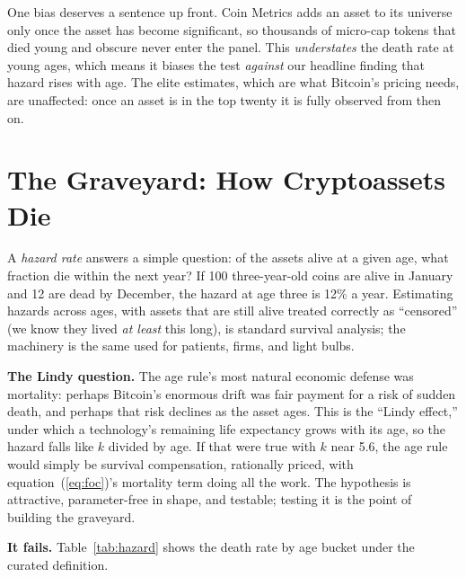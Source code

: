 \documentclass[11pt]{article}
\begin{document}
One bias deserves a sentence up front. Coin Metrics adds an asset to its universe only once the asset has become significant, so thousands of micro-cap tokens that died young and obscure never enter the panel. This \emph{understates} the death rate at young ages, which means it biases the test \emph{against} our headline finding that hazard rises with age. The elite estimates, which are what Bitcoin's pricing needs, are unaffected: once an asset is in the top twenty it is fully observed from then on.

\section{The Graveyard: How Cryptoassets Die}

A \emph{hazard rate} answers a simple question: of the assets alive at a given age, what fraction die within the next year? If 100 three-year-old coins are alive in January and 12 are dead by December, the hazard at age three is 12\% a year. Estimating hazards across ages, with assets that are still alive treated correctly as ``censored'' (we know they lived \emph{at least} this long), is standard survival analysis; the machinery is the same used for patients, firms, and light bulbs.

\textbf{The Lindy question.} The age rule's most natural economic defense was mortality: perhaps Bitcoin's enormous drift was fair payment for a risk of sudden death, and perhaps that risk declines as the asset ages. This is the ``Lindy effect,'' under which a technology's remaining life expectancy grows with its age, so the hazard falls like $k$ divided by age. If that were true with $k$ near 5.6, the age rule would simply be survival compensation, rationally priced, with equation~(\ref{eq:foc})'s mortality term doing all the work. The hypothesis is attractive, parameter-free in shape, and testable; testing it is the point of building the graveyard.

\textbf{It fails.} Table~\ref{tab:hazard} shows the death rate by age bucket under the curated definition.
\end{document}
